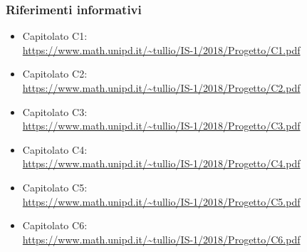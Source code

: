     \subsubsection{Riferimenti informativi}
        \begin{itemize}
            \item Capitolato C1:\\ \url{https://www.math.unipd.it/~tullio/IS-1/2018/Progetto/C1.pdf}
            \item Capitolato C2:\\ \url{https://www.math.unipd.it/~tullio/IS-1/2018/Progetto/C2.pdf}
            \item Capitolato C3:\\ \url{https://www.math.unipd.it/~tullio/IS-1/2018/Progetto/C3.pdf}
            \item Capitolato C4:\\ \url{https://www.math.unipd.it/~tullio/IS-1/2018/Progetto/C4.pdf}
            \item Capitolato C5:\\ \url{https://www.math.unipd.it/~tullio/IS-1/2018/Progetto/C5.pdf}
            \item Capitolato C6:\\ \url{https://www.math.unipd.it/~tullio/IS-1/2018/Progetto/C6.pdf}
        \end{itemize}
   